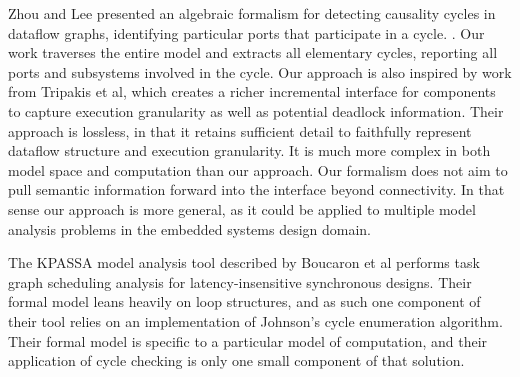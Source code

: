 Zhou and Lee presented an algebraic formalism for detecting causality cycles
in dataflow graphs, identifying particular ports that participate in a cycle.
\cite{comp:causality}. Our work traverses the entire model and extracts all 
elementary cycles,
reporting all ports and subsystems involved in the cycle.
Our approach is also inspired by work from Tripakis et al, which 
creates a richer incremental interface for components to capture execution 
granularity as well as potential deadlock information\cite{moc:hsdf}.  
Their approach is lossless, in that it retains sufficient detail to faithfully represent dataflow structure and execution granularity.  It is much more complex in both model space and computation than our approach. Our formalism does not aim to pull 
semantic information forward into the interface beyond connectivity.  In that sense our approach is more general, as it could be applied to multiple 
model analysis problems in the embedded systems design domain.

The KPASSA model analysis tool described by Boucaron et al 
\cite{cycles:boucaron} performs task graph scheduling analysis for 
latency-insensitive synchronous designs.   Their formal model leans heavily on loop structures, and as such one component of their tool relies on an 
implementation of Johnson's cycle enumeration algorithm\cite{cycles:boucaron2}.  Their formal model is specific to a particular model of computation, and their application of cycle checking is only one small component of that solution.


